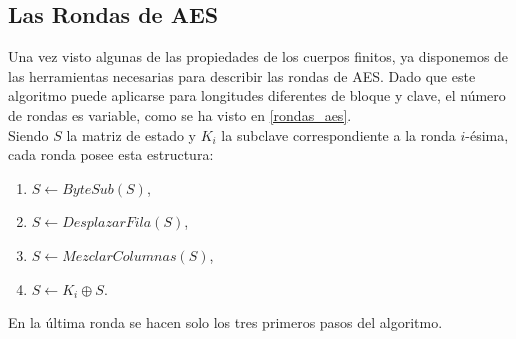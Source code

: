 \subsection{Las Rondas de AES}
Una vez visto algunas de las propiedades de los cuerpos finitos, ya disponemos de las herramientas necesarias para describir las rondas de AES.
Dado que este algoritmo puede aplicarse para longitudes diferentes de bloque y clave, el número de rondas es variable, como se ha visto en \ref{rondas_aes}.\\
Siendo $S$ la matriz de estado y $K_i$ la subclave correspondiente a la ronda $i$-ésima, cada ronda posee esta estructura:
\begin{enumerate}
	\item $S \leftarrow ByteSub(S)$,
	\item $S \leftarrow DesplazarFila(S)$,
	\item $S \leftarrow MezclarColumnas(S)$,
	\item $S \leftarrow K_i \oplus S$.
\end{enumerate}
En la última ronda se hacen solo los tres primeros pasos del algoritmo.

